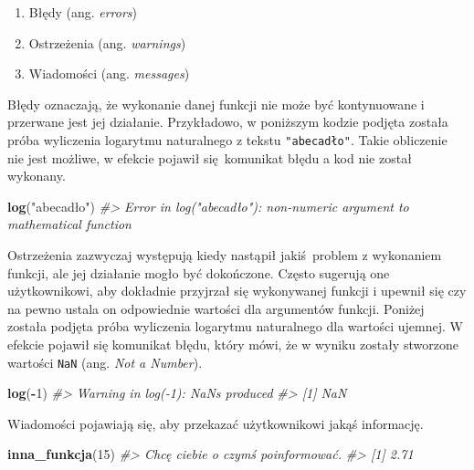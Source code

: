 \documentclass[paper=6in:9in,pagesize=pdftex,headinclude=on,footinclude=on,10pt]{scrbook}
\newenvironment{Shaded}{\begin{snugshade}}{\end{snugshade}}
\newcommand{\CommentTok}[1]{\textcolor[rgb]{0.56,0.35,0.01}{\textit{#1}}}
\newcommand{\DecValTok}[1]{\textcolor[rgb]{0.00,0.00,0.81}{#1}}
\newcommand{\KeywordTok}[1]{\textcolor[rgb]{0.13,0.29,0.53}{\textbf{#1}}}
\newcommand{\NormalTok}[1]{#1}
\newcommand{\OperatorTok}[1]{\textcolor[rgb]{0.81,0.36,0.00}{\textbf{#1}}}
\newcommand{\StringTok}[1]{\textcolor[rgb]{0.31,0.60,0.02}{#1}}
\providecommand{\tightlist}{%
  \setlength{\itemsep}{0pt}\setlength{\parskip}{0pt}}
\begin{document}
\begin{enumerate}
\def\labelenumi{\arabic{enumi}.}
\tightlist
\item
  Błędy (ang. \emph{errors})
\item
  Ostrzeżenia (ang. \emph{warnings})
\item
  Wiadomości (ang. \emph{messages})
\end{enumerate}

Błędy oznaczają, że wykonanie danej funkcji nie może być kontynuowane i przerwane jest jej działanie.
Przykładowo, w poniższym kodzie podjęta została próba wyliczenia logarytmu naturalnego z tekstu \texttt{"abecadło"}.
Takie obliczenie nie jest możliwe, w efekcie pojawił się~komunikat błędu a kod nie został wykonany.

\begin{Shaded}
\begin{Highlighting}[]
\KeywordTok{log}\NormalTok{(}\StringTok{"abecadło"}\NormalTok{)}
\CommentTok{#> Error in log("abecadło"): non-numeric argument to mathematical function}
\end{Highlighting}
\end{Shaded}

Ostrzeżenia zazwyczaj występują kiedy nastąpił jakiś~problem z wykonaniem funkcji, ale jej działanie mogło być dokończone.
Często sugerują one użytkownikowi, aby dokładnie przyjrzał się wykonywanej funkcji i upewnił się czy na pewno ustala on odpowiednie wartości dla argumentów funkcji.
Poniżej została podjęta próba wyliczenia logarytmu naturalnego dla wartości ujemnej.
W efekcie pojawił się komunikat błędu, który mówi, że w wyniku zostały stworzone wartości \texttt{NaN} (ang. \emph{Not a Number}).

\begin{Shaded}
\begin{Highlighting}[]
\KeywordTok{log}\NormalTok{(}\OperatorTok{-}\DecValTok{1}\NormalTok{)}
\CommentTok{#> Warning in log(-1): NaNs produced}
\CommentTok{#> [1] NaN}
\end{Highlighting}
\end{Shaded}

Wiadomości pojawiają się, aby przekazać użytkownikowi jakąś informację.

\begin{Shaded}
\begin{Highlighting}[]
\KeywordTok{inna_funkcja}\NormalTok{(}\DecValTok{15}\NormalTok{)}
\CommentTok{#> Chcę ciebie o czymś poinformować.}
\CommentTok{#> [1] 2.71}
\end{Highlighting}
\end{Shaded}
\end{document}

